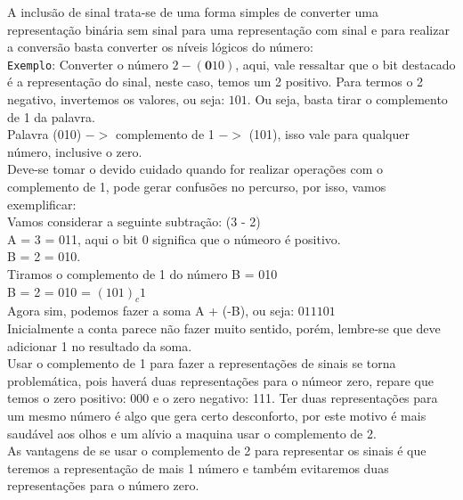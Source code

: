 \documentclass[12pt, onecolumn]{article}
\begin{document}
	A inclusão de sinal trata-se de uma forma simples de converter uma 
	representação binária sem sinal para uma representação com sinal e 
	para realizar a conversão basta converter os níveis lógicos do número:\\
	\newline
	\texttt{Exemplo}: Converter o número $2 - (\textbf{0}10)$, aqui, vale ressaltar
	que o bit destacado é a representação do sinal, neste caso, temos um 2 
	positivo. Para termos o 2 negativo, invertemos os valores, ou seja: 
	$101$. Ou seja, basta tirar o complemento de 1 da palavra. \\
	\newline
	Palavra (010) $->$ complemento de 1 $->$ (101), isso vale para qualquer número,
	inclusive o zero.\\
	\newline
	Deve-se tomar o devido cuidado quando for realizar operações com o 
	complemento de 1, pode gerar confusões no percurso, por isso, vamos
	exemplificar: \\
	\newline
	Vamos considerar a seguinte subtração: (3 - 2) \\
	\newline
	A = 3 = 011, aqui o bit 0 significa que o númeoro é positivo.\\
	B = 2 = 010. \\
	Tiramos o complemento de 1 do número B = 010\\
	B = 2 = 010 = $(101)_c1$ \\
	\newline
	Agora sim, podemos fazer a soma A + (-B), ou seja: 
	$
	011  
	101
	$ \\
	Inicialmente a conta parece não fazer muito sentido, porém, 
	lembre-se que deve adicionar 1 no resultado da soma.\\
	\newline	
	Usar o complemento de 1 para fazer a representações de sinais
	se torna problemática, pois haverá duas representações para o
	númeor zero, repare que temos o zero positivo: 000 e o
	zero negativo: 111. Ter duas representações para um mesmo
	número é algo que gera certo desconforto, por este motivo
	é mais saudável aos olhos e um alívio a maquina usar o 
	complemento de 2. \\
	\newline
	As vantagens de se usar o complemento de 2 para representar os
	sinais é que teremos a representação de mais 1 número e também
	evitaremos duas representações para o número zero.\\
\end{document}
